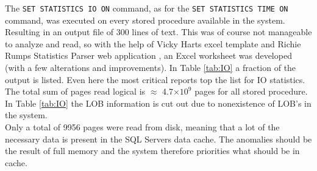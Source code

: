 \documentclass{cslthse-msc}
\begin{document}
The \texttt{SET STATISTICS IO ON} command, as for the \texttt{SET STATISTICS TIME ON} command, was executed on every stored procedure available in the system. Resulting in an output file of 300 lines of text. This was of course not manageable to analyze and read, so with the help of Vicky Harts excel template    \cite{Vicky} and Richie Rumps Statistics Parser web application    \cite{Rump}, an Excel worksheet was developed (with a few alterations and improvements). In Table \ref{tab:IO} a fraction of the output is listed. Even here the most critical reports top the list for IO statistics. The total sum of pages read logical is $\approx$ 4.7$\times 10^9$ pages for all stored procedure. In Table \ref{tab:IO} the LOB information is cut out due to nonexistence of LOB's in the system.\\ Only a total of 9956 pages were read from disk, meaning that a lot of the necessary data is present in the SQL Servers data cache. The anomalies should be the result of full memory and the system therefore priorities what should be in cache. 
\end{document}
